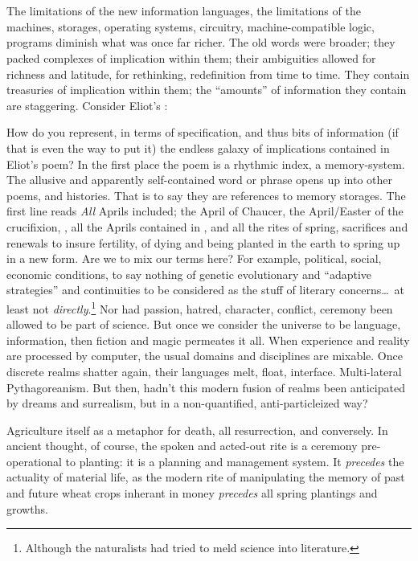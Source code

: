\chapter{}

The limitations of the new information languages, the limitations of the machines, storages, operating systems, circuitry, machine-compatible logic, programs diminish what was once far richer. The old words were broader; they packed complexes of implication within them; their ambiguities allowed for richness and latitude, for rethinking, redefinition from time to time. They contain treasuries of implication within them; the \enquote{amounts} of information they contain are staggering. Consider Eliot's :

How do you represent, in terms of specification, and thus bits of information (if that is even the way to put it) the endless galaxy of implications contained in Eliot's poem? In the first place the poem is a rhythmic index, a memory-system. The allusive and apparently self-contained word or phrase opens up into other poems, and histories. That is to say they are references to memory storages. The first line reads  \emph{All} Aprils included; the April of Chaucer, the April/Easter of the crucifixion, , all the Aprils contained in , and all the rites of spring, sacrifices and renewals to insure fertility, of dying and being planted in the earth to spring up in a new form. Are we to mix our terms here? For example, political, social, economic conditions, to say nothing of genetic evolutionary and \enquote{adaptive strategies} and continuities to be considered as the stuff of literary concerns\ldots\ at least not \emph{directly}.\footnote{Although the naturalists had tried to meld science into literature.} Nor had passion, hatred, character, conflict, ceremony been allowed to be part of science. But once we consider the universe to be language, information, then fiction and magic permeates it all. When experience and reality are processed by computer, the usual domains and disciplines are mixable. Once discrete realms shatter again, their languages melt, float, interface. Multi-lateral Pythagoreanism. But then, hadn't this modern fusion of realms been anticipated by dreams and surrealism, but in a non-quantified, anti-particleized way?

Agriculture itself as a metaphor for death, all resurrection, and conversely. In ancient thought, of course, the spoken and acted-out rite is a ceremony pre-operational to planting: it is a planning and management system. It \emph{precedes} the actuality of material life, as the modern rite of manipulating the memory of past and future wheat crops inherant in money \emph{precedes} all spring plantings and growths.

